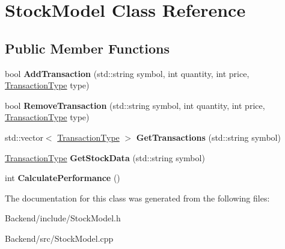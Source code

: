 \hypertarget{class_stock_model}{}\section{Stock\+Model Class Reference}
\label{class_stock_model}
\subsection*{Public Member Functions}
\begin{DoxyCompactItemize}
\item 
\mbox{\label{class_stock_model_aa5de5466e50f2bba375387dd35158b9d}} 
bool {\bfseries Add\+Transaction} (std\+::string symbol, int quantity, int price, \mbox{\hyperlink{class_transaction_type}{Transaction\+Type}} type)
\item 
\mbox{\label{class_stock_model_a2ace2720dc1742b8d563b96bb2e81eec}} 
bool {\bfseries Remove\+Transaction} (std\+::string symbol, int quantity, int price, \mbox{\hyperlink{class_transaction_type}{Transaction\+Type}} type)
\item 
\mbox{\label{class_stock_model_afcd1e771bc7417eb735ab383d24d4988}} 
std\+::vector$<$ \mbox{\hyperlink{class_transaction_type}{Transaction\+Type}} $>$ {\bfseries Get\+Transactions} (std\+::string symbol)
\item 
\mbox{\label{class_stock_model_ac892a9e35bc731342d92c84f5e0bfff6}} 
\mbox{\hyperlink{class_transaction_type}{Transaction\+Type}} {\bfseries Get\+Stock\+Data} (std\+::string symbol)
\item 
\mbox{\label{class_stock_model_af9ac92e3e10b39f999ea5a41a96b7b9c}} 
int {\bfseries Calculate\+Performance} ()
\end{DoxyCompactItemize}


The documentation for this class was generated from the following files\+:\begin{DoxyCompactItemize}
\item 
Backend/include/Stock\+Model.\+h\item 
Backend/src/Stock\+Model.\+cpp\end{DoxyCompactItemize}
